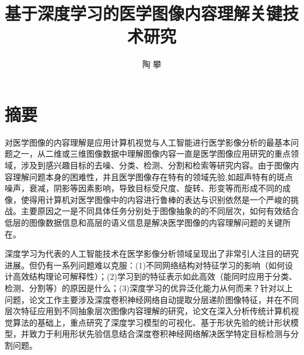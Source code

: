  \confidential{}%
  \title[中国科学院大学博士论文]{基于深度学习的医学图像内容理解关键技术研究}%
  \author{陶 攀}%
\maketitle
\makeenglishtitle
\makedeclaration
\chapter*{摘\quad 要}%
\setcounter{page}{1}%

对医学图像的内容理解是应用计算机视觉与人工智能进行医学影像分析的最基本问题之一，从二维或三维图像数据中理解图像内容一直是医学图像应用研究的重点领域，涉及到感兴趣目标的去噪、分类、检测、分割和检索等研究内容。由于图像内容理解问题本身的困难性，并且医学图像存在特有的领域先验,如超声特有的斑点噪声，衰减，阴影等因素影响，导致目标受尺度、旋转、形变等而形成不同的成像，使得用计算机对医学图像中的内容进行鲁棒的表达与识别依然是一个严峻的挑战。主要原因之一是不同具体任务分别处于图像抽象的的不同层次，如何有效结合低层的图像数据信息和高层的语义信息是解决医学图像的内容理解问题的关键所在。

深度学习为代表的人工智能技术在医学影像分析领域呈现出了非常引人注目的研究进展。但仍有一系列问题难以克服：(1)不同网络结构对特征学习的影响（如何设计高效结构理论可解释性）；(2)学习到的特征表示如此高效（能同时应用于分类、检测、分割等）的原因是什么；(3)深度学习的优异泛化能力从何而来？针对以上问题，论文工作主要涉及深度卷积神经网络自动提取分层递阶图像特征，并在不同层次特征应用到不同抽象层次图像内容理解的研究，论文在深入分析传统计算机视觉算法的基础上，重点研究了深度学习模型的可视化、基于形状先验的统计形状模型，并致力于利用形状先验信息结合深度卷积神经网络解决医学特定目标检测与分割问题。

